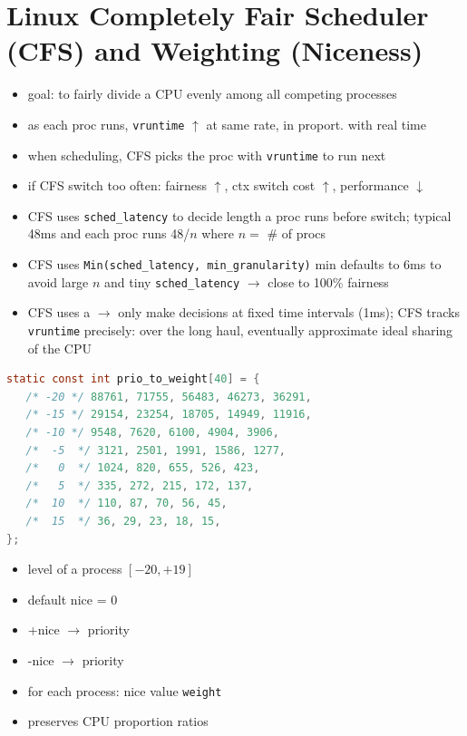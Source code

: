\section*{Linux Completely Fair Scheduler (CFS) and Weighting (Niceness)}
\begin{itemize}
\item goal: to fairly divide a CPU evenly among all competing processes
\item as each proc runs, \texttt{vruntime} $\uparrow$ at same rate, in proport.
with real time
\item when scheduling, CFS picks the proc with  \texttt{vruntime} to run next
\item if CFS switch too often: fairness $\uparrow$, ctx switch cost $\uparrow$, performance $\downarrow$
\item CFS uses \texttt{sched\_latency} to decide length a proc runs before switch; typical 48ms and each proc runs 48/$n$ where $n=$ \# of procs
\item CFS uses \texttt{Min(sched\_latency, min\_granularity)} min defaults to 6ms to avoid large $n$ and tiny \texttt{sched\_latency} $\to$ close to 100\% fairness
\item CFS uses a  $\to$ only make decisions at fixed time intervals (1ms); CFS tracks \texttt{vruntime} precisely: over the long haul, eventually approximate ideal sharing of the CPU
\end{itemize}
\begin{minipage}{.66\linewidth}
\begin{lstlisting}[language=c]
static const int prio_to_weight[40] = {
   /* -20 */ 88761, 71755, 56483, 46273, 36291,
   /* -15 */ 29154, 23254, 18705, 14949, 11916,
   /* -10 */ 9548, 7620, 6100, 4904, 3906,
   /*  -5  */ 3121, 2501, 1991, 1586, 1277,
   /*   0  */ 1024, 820, 655, 526, 423,
   /*   5  */ 335, 272, 215, 172, 137,
   /*  10  */ 110, 87, 70, 56, 45,
   /*  15  */ 36, 29, 23, 18, 15,
};
\end{lstlisting}
\end{minipage}
\begin{minipage}{.34\linewidth}
  \flushleft
  \begin{itemize}
  \item {} level of a process $[-20, +19]$
  \item default nice = 0
  \item +nice $\to$  priority
  \item -nice $\to$  priority
  \item for each process: nice value  \texttt{weight}
  \item preserves CPU proportion ratios
  \end{itemize}
\end{minipage}

